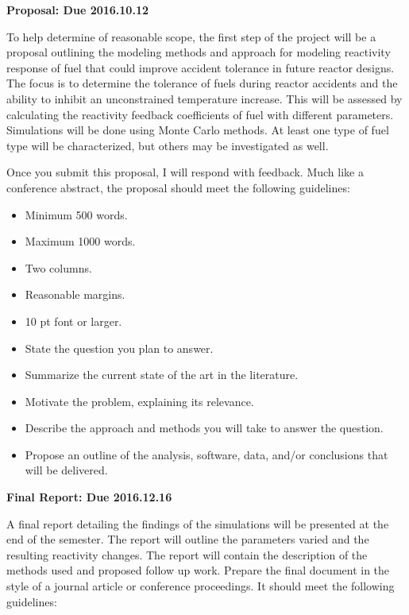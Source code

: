 \documentclass[12pts, answers]{exam}
\newcommand{\duedate}{2016.12.16}
\begin{document}
\begin{questions}
\addpoints
\question[10] \textbf{Proposal: Due 2016.10.12}

To help determine of reasonable scope, the first step of the project will be a 
proposal outlining the modeling methods and approach for modeling reactivity 
response of fuel that could improve accident tolerance in future reactor 
designs. The focus is to determine the tolerance of fuels during reactor 
accidents and the ability to inhibit an unconstrained temperature increase. 
This will be assessed by calculating the reactivity feedback coefficients of 
fuel with different parameters.  Simulations will be done using Monte Carlo 
methods.  At least one type of fuel type will be characterized, but others may 
be investigated as well.

Once you submit this proposal, I will respond with feedback. Much
like a conference abstract, the proposal should meet the following guidelines:

\begin{itemize}
\item Minimum 500 words.
\item Maximum 1000 words.
\item Two columns.
\item Reasonable margins.
\item 10 pt font or larger.
\item State the question you plan to answer.
\item Summarize the current state of the art in the literature.
\item Motivate the problem, explaining its relevance.
\item Describe the approach and methods you will take to answer the question.
\item Propose an outline of the analysis, software, data, and/or conclusions that will be delivered.
\end{itemize}

\question[90] \textbf{Final Report: Due \duedate}

A final report detailing the findings of the simulations will be presented at
the end of the semester.  The report will outline the parameters varied and the
resulting reactivity changes.  The report will contain the description of the
methods used and proposed follow up work.  Prepare the final document in the
style of a journal article or conference proceedings. It should meet the
following guidelines:


\end{questions}
\end{document}

